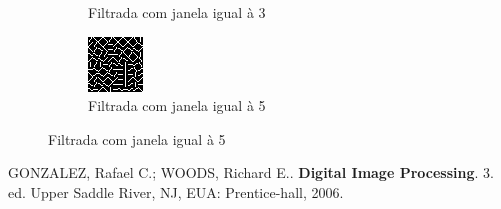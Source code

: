 \documentclass[10pt,a4paper]{article}
\begin{document}
\begin{figure}[!ht]
\begin{subfigure}[ht]{0.20\textwidth}
        \caption{Filtrada com janela igual à 3}
    \end{subfigure}
    \qquad
    \begin{subfigure}[ht]{0.20\textwidth}
        \includegraphics[width=\textwidth]{4_filtered_window_5.jpg}
        \caption{Filtrada com janela igual à 5}
    \end{subfigure}
\end{figure}

\begin{thebibliography}{99}
     GONZALEZ, Rafael C.; WOODS, Richard E.. \textbf{Digital Image Processing}. 3. ed. Upper Saddle River, NJ, EUA: Prentice-hall, 2006.
\end{thebibliography}
\end{document}
